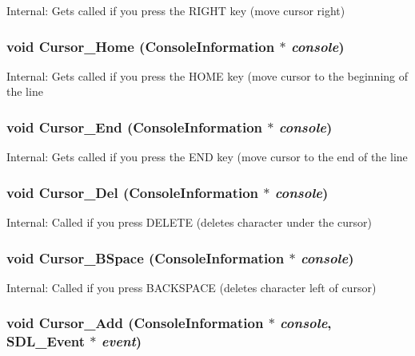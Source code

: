 Internal: Gets called if you press the RIGHT key (move cursor right) 
\subsubsection{\setlength{\rightskip}{0pt plus 5cm}void Cursor\_\-Home ({\bf Console\-Information} $\ast$ {\em console})}\label{CON__console_8h_a39}


Internal: Gets called if you press the HOME key (move cursor to the beginning of the line 
\subsubsection{\setlength{\rightskip}{0pt plus 5cm}void Cursor\_\-End ({\bf Console\-Information} $\ast$ {\em console})}\label{CON__console_8h_a40}


Internal: Gets called if you press the END key (move cursor to the end of the line 
\subsubsection{\setlength{\rightskip}{0pt plus 5cm}void Cursor\_\-Del ({\bf Console\-Information} $\ast$ {\em console})}\label{CON__console_8h_a41}


Internal: Called if you press DELETE (deletes character under the cursor) 
\subsubsection{\setlength{\rightskip}{0pt plus 5cm}void Cursor\_\-BSpace ({\bf Console\-Information} $\ast$ {\em console})}\label{CON__console_8h_a42}


Internal: Called if you press BACKSPACE (deletes character left of cursor) 
\subsubsection{\setlength{\rightskip}{0pt plus 5cm}void Cursor\_\-Add ({\bf Console\-Information} $\ast$ {\em console}, SDL\_\-Event $\ast$ {\em event})}\label{CON__console_8h_a43}


